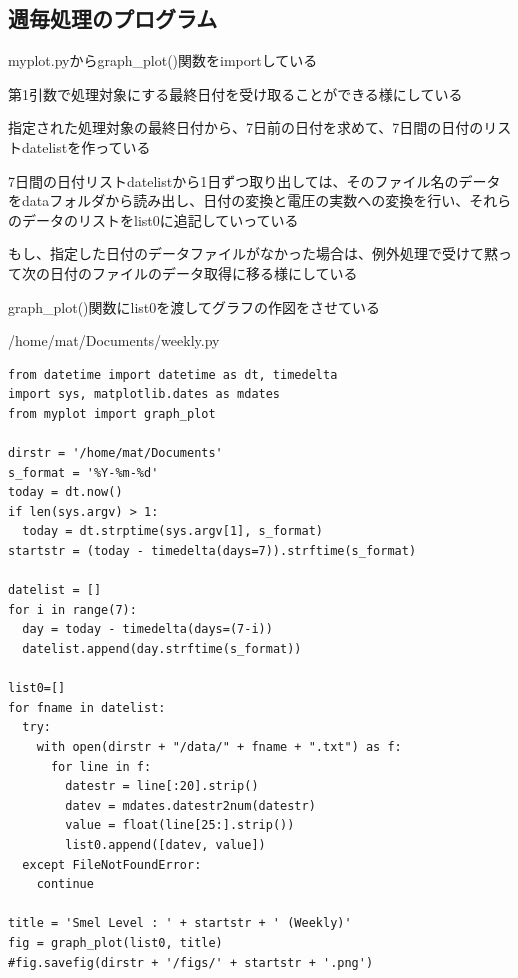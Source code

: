 \documentclass[12pt,a4j]{jsbook}
\begin{document}
\subsection{週毎処理のプログラム}

	myplot.pyからgraph\_plot()関数をimportしている

	第1引数で処理対象にする最終日付を受け取ることができる様にしている

	指定された処理対象の最終日付から、7日前の日付を求めて、7日間の日付のリストdatelistを作っている

	7日間の日付リストdatelistから1日ずつ取り出しては、そのファイル名のデータをdataフォルダから読み出し、日付の変換と電圧の実数への変換を行い、それらのデータのリストをlist0に追記していっている

	もし、指定した日付のデータファイルがなかった場合は、例外処理で受けて黙って次の日付のファイルのデータ取得に移る様にしている

	graph\_plot()関数にlist0を渡してグラフの作図をさせている
\begin{spacing}{0.87}
\begin{itembox}[l]{/home/mat/Documents/weekly.py}
\begin{verbatim}
from datetime import datetime as dt, timedelta
import sys, matplotlib.dates as mdates
from myplot import graph_plot

dirstr = '/home/mat/Documents'
s_format = '%Y-%m-%d'
today = dt.now()
if len(sys.argv) > 1:
  today = dt.strptime(sys.argv[1], s_format)
startstr = (today - timedelta(days=7)).strftime(s_format)

datelist = []
for i in range(7):
  day = today - timedelta(days=(7-i))
  datelist.append(day.strftime(s_format))

list0=[]
for fname in datelist:
  try:
    with open(dirstr + "/data/" + fname + ".txt") as f:
      for line in f:
        datestr = line[:20].strip()
        datev = mdates.datestr2num(datestr)
        value = float(line[25:].strip())
        list0.append([datev, value])
  except FileNotFoundError:
    continue

title = 'Smel Level : ' + startstr + ' (Weekly)'
fig = graph_plot(list0, title)
#fig.savefig(dirstr + '/figs/' + startstr + '.png')
\end{verbatim}
\end{itembox}
\end{spacing}

\end{document}
